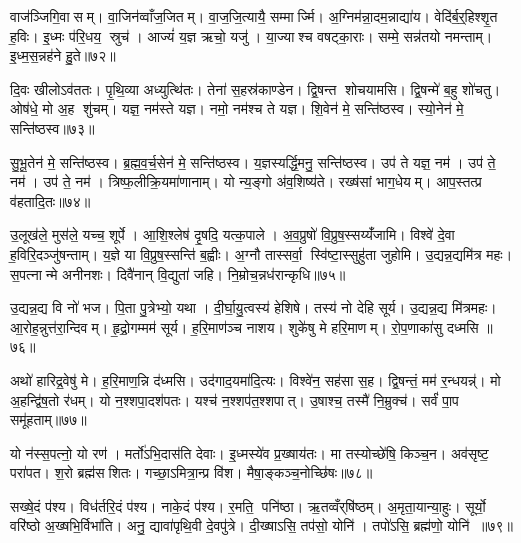 वाज॑ञ्जिगि॒वासम्। वा॒जिन॑व्वाँज॒जितम्। वा॒ज॒जि॒त्यायै॒ सम्मार्ज्मि। अ॒ग्निम॑न्ना॒दम॒न्नाद्या॑य। वेदि॑र्ब॒र्॒हिश्शृ॒त ह॒विः। इ॒ध्मः प॑रि॒धय॒ स्रुच॑। आज्यं॑ य॒ज्ञ ऋचो॒ यजु॑। या॒ज्याश्च वषट्का॒राः। सम्मे॒ सन्न॑तयो नमन्ताम्। इ॒ध्म॒स॒न्नह॑ने हु॒ते॥७२॥

दि॒वः खीलोऽव॑ततः। पृ॒थि॒व्या अध्युत्थि॑तः। तेना॑ स॒हस्र॑काण्डेन। द्वि॒षन्त शोचयामसि। द्वि॒षन्मे॑ ब॒हु शो॑चतु। ओष॑धे॒ मो अ॒ह शु॑चम्। यज्ञ॒ नम॑स्ते यज्ञ। नमो॒ नम॑श्च ते यज्ञ। शि॒वेन॑ मे॒ सन्ति॑ष्ठस्व। स्यो॒नेन॑ मे॒ सन्ति॑ष्ठस्व॥७३॥

सु॒भू॒तेन॑ मे॒ सन्ति॑ष्ठस्व। ब्र॒ह्म॒व॒र्च॒सेन॑ मे॒ सन्ति॑ष्ठस्व। य॒ज्ञस्यर्द्धि॒मनु॒ सन्ति॑ष्ठस्व। उप॑ ते यज्ञ॒ नम॑। उप॑ ते॒ नम॑। उप॑ ते॒ नम॑। त्रिष्फ॒लीक्रि॒यमा॑णानाम्। यो न्य॒ङ्गो अ॑व॒शिष्य॑ते। रख्ष॑सां भाग॒धेयम्। आप॒स्तत्प्र व॑हतादि॒तः॥७४॥

उ॒लूख॑ले॒ मुस॑ले॒ यच्च॒ शूर्पे। आ॒शि॒श्लेष॑ दृ॒षदि॒ यत्क॒पाले। अ॒व॒प्रुषो॑ वि॒प्रुष॒स्सय्यँ॑जामि। विश्वे॑ दे॒वा ह॒विरि॒दञ्जु॑षन्ताम्। य॒ज्ञे या वि॒प्रुष॒स्सन्ति॑ ब॒ह्वीः। अ॒ग्नौ तास्सर्वा॒ स्वि॑ष्टा॒स्सुहु॑ता जुहोमि। उ॒द्यन्न॒द्यमि॑त्र महः। स॒पत्नान्मे अनीनशः। दिवै॑नान् वि॒द्युता॑ जहि। नि॒म्रोच॒न्नध॑रान्कृधि॥७५॥

उ॒द्यन्न॒द्य वि नो॑ भज। पि॒ता पु॒त्रेभ्यो॒ यथा। दी॒र्घा॒यु॒त्वस्य॑ हेशिषे। तस्य॑ नो देहि सूर्य। उ॒द्यन्न॒द्य मि॑त्रमहः। आ॒रोह॒न्नुत्त॑रा॒न्दिवम्। हृ॒द्रो॒गम्मम॑ सूर्य। ह॒रि॒माण॑ञ्च नाशय। शुके॑षु मे हरि॒माणम्। रो॒प॒णाका॑सु दध्मसि ॥७६॥

अथो॑ हारिद्र॒वेषु॑ मे। ह॒रि॒माण॒न्नि द॑ध्मसि। उद॑गाद॒यमा॑दि॒त्यः। विश्वे॑न॒ सह॑सा स॒ह। द्वि॒षन्तं॒ मम॑ र॒न्धयन्न्॑। मो अ॒हन्द्वि॑ष॒तो र॑धम्। यो न॒श्शपा॒दश॑पतः। यश्च॑ न॒श्शप॑त॒श्शपात्। उ॒षाश्च॒ तस्मै॑ नि॒म्रुक्च॑। सर्वं॑ पा॒प समू॑हताम्॥७७॥

यो न॑स्स॒पत्नो॒ यो रण॑। मर्तो॑ऽभि॒दास॑ति देवाः। इ॒ध्मस्ये॑व प्र॒ख्षाय॑तः। मा तस्योच्छे॑षि॒ किञ्च॒न। अव॑सृष्ट॒ परा॑पत। श॒रो ब्रह्म॑सशितः। गच्छा॒ऽमित्रा॒न्प्र वि॑श। मैषा॒ङ्कञ्च॒नोच्छि॑षः॥७८॥\anuvakamend[पति॑ प्र॒जाप॑तये तप॒स्वी वा॒चा सौभ॑गाय प॒शून्मे॑ पिन्वस्व दुर्मरा॒युन्दे॑व॒याना॑नग्ने॒ऽन्तरि॑ख्षे॒ऽहमुत्त॑रो भूयासं प्र॒जाप॑तिरसि स॒र्वत॑श्श्रि॒तः प्रवि॑ष्टन्दे॒वता॑भिर्वाज॒जितं॑ पृथि॒वी ह्व॑यताम॒ग्निराग्नीध्राद्वृश्चत ससृ॒वास हु॒ते स्यो॒नेन॑ मे॒ सन्ति॑ष्ठस्वे॒तः कृ॑धि दध्मस्यूहताम॒ष्टौ च॑]

सख्षे॒दं प॑श्य। विध॑र्तरि॒दं प॑श्य। नाके॒दं प॑श्य। र॒मति॒ पनि॑ष्ठा। ऋ॒तव्वँर्‌षि॑ष्ठम्। अ॒मृता॒यान्या॒हुः। सूर्यो॒ वरि॑ष्ठो अ॒ख्षभि॒र्विभा॑ति। अनु॒ द्यावा॑पृथि॒वी दे॒वपु॑त्रे। दी॒ख्षाऽसि॒ तप॑सो॒ योनि॑। तपो॑ऽसि॒ ब्रह्म॑णो॒ योनि॑ ॥७९॥

